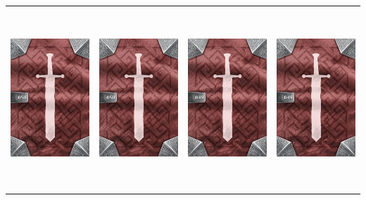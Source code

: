 \documentclass{minimal}
\begin{document}
{\begin{longtable}{llll}
\includegraphics[width=44mm,height=68mm]{./50-56/gh-050-steel-sabatons-back.png} &
\includegraphics[width=44mm,height=68mm]{./50-56/gh-050-steel-sabatons-back.png} &
\includegraphics[width=44mm,height=68mm]{./43-49/gh-049-sun-earring-back.png} &
\includegraphics[width=44mm,height=68mm]{./43-49/gh-049-sun-earring-back.png}\\ 

\end{longtable}}
\end{document}
